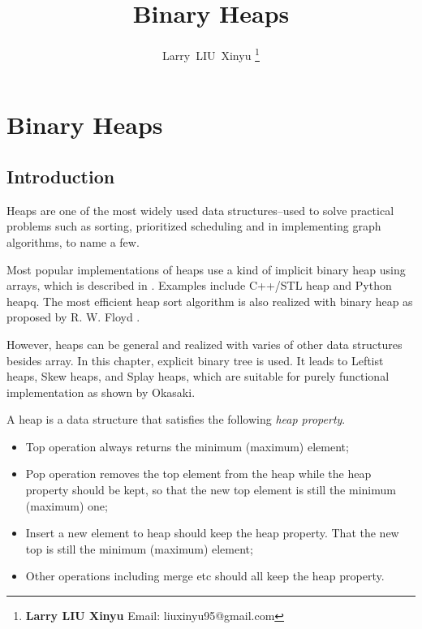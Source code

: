 \documentclass{article}
\begin{document}


\title{Binary Heaps}

\author{Larry~LIU~Xinyu
\thanks{{\bfseries Larry LIU Xinyu } \newline
  Email: liuxinyu95@gmail.com \newline}
  }

\maketitle
\fi


\ifx\wholebook\relax
\chapter{Binary Heaps}
\fi

\section{Introduction}
\label{introduction}

Heaps are one of the most widely used data structures--used
to solve practical problems such as sorting, prioritized
scheduling and in implementing graph algorithms, to name a few\cite{wiki-heap}.

Most popular implementations of heaps use a kind of implicit
binary heap using arrays, which is described in \cite{CLRS}.
Examples include C++/STL heap and Python heapq. The most efficient
heap sort algorithm is also
realized with binary heap as proposed by R. W. Floyd
\cite{wiki-heapsort} \cite{rosetta-heapsort}.

However, heaps can be general and realized with varies
of other data structures besides array.
In this chapter, explicit
binary tree is used. It leads to Leftist heaps, Skew heaps,
and Splay heaps, which are suitable for purely functional
implementation as shown
by Okasaki\cite{okasaki-book}.

A heap is a data structure that satisfies the following {\em heap property}.
\begin{itemize}
\item Top operation always returns the minimum (maximum) element;
\item Pop operation removes the top element from the heap while the heap
property should be kept, so that the new top element is still the
minimum (maximum) one;
\item Insert a new element to heap should keep the heap property. That
the new top is still the minimum (maximum) element;
\item Other operations including merge etc should all keep the heap property.
\end{itemize}
\end{document}

